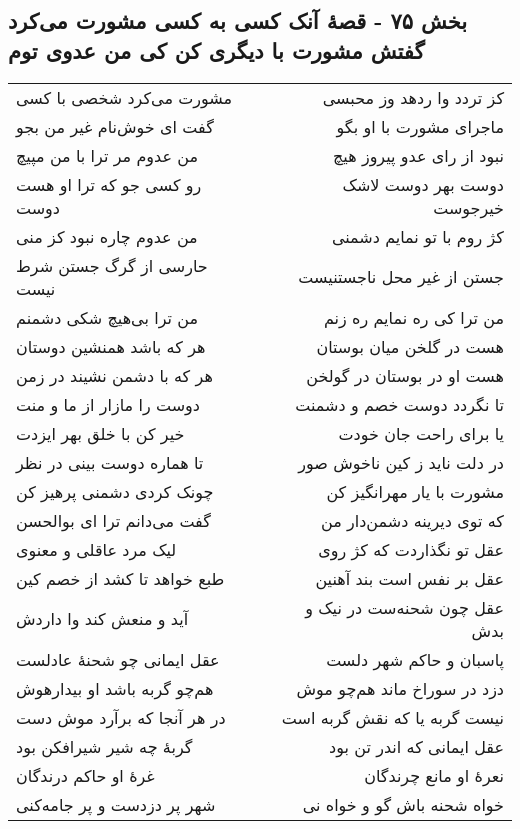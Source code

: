 \begin{center}
\section*{بخش ۷۵ - قصهٔ آنک کسی به کسی مشورت می‌کرد گفتش  مشورت با دیگری کن کی من عدوی توم}
\label{sec:sh075}
\begin{longtable}{l p{0.5cm} r}
مشورت می‌کرد شخصی با کسی
&&
کز تردد وا ردهد وز محبسی
\\
گفت ای خوش‌نام غیر من بجو
&&
ماجرای مشورت با او بگو
\\
من عدوم مر ترا با من مپیچ
&&
نبود از رای عدو پیروز هیچ
\\
رو کسی جو که ترا او هست دوست
&&
دوست بهر دوست لاشک خیرجوست
\\
من عدوم چاره نبود کز منی
&&
کژ روم با تو نمایم دشمنی
\\
حارسی از گرگ جستن شرط نیست
&&
جستن از غیر محل ناجستنیست
\\
من ترا بی‌هیچ شکی دشمنم
&&
من ترا کی ره نمایم ره زنم
\\
هر که باشد همنشین دوستان
&&
هست در گلخن میان بوستان
\\
هر که با دشمن نشیند در زمن
&&
هست او در بوستان در گولخن
\\
دوست را مازار از ما و منت
&&
تا نگردد دوست خصم و دشمنت
\\
خیر کن با خلق بهر ایزدت
&&
یا برای راحت جان خودت
\\
تا هماره دوست بینی در نظر
&&
در دلت ناید ز کین ناخوش صور
\\
چونک کردی دشمنی پرهیز کن
&&
مشورت با یار مهرانگیز کن
\\
گفت می‌دانم ترا ای بوالحسن
&&
که توی دیرینه دشمن‌دار من
\\
لیک مرد عاقلی و معنوی
&&
عقل تو نگذاردت که کژ روی
\\
طبع خواهد تا کشد از خصم کین
&&
عقل بر نفس است بند آهنین
\\
آید و منعش کند وا داردش
&&
عقل چون شحنه‌ست در نیک و بدش
\\
عقل ایمانی چو شحنهٔ عادلست
&&
پاسبان و حاکم شهر دلست
\\
هم‌چو گربه باشد او بیدارهوش
&&
دزد در سوراخ ماند هم‌چو موش
\\
در هر آنجا که برآرد موش دست
&&
نیست گربه یا که نقش گربه است
\\
گربهٔ چه شیر شیرافکن بود
&&
عقل ایمانی که اندر تن بود
\\
غرهٔ او حاکم درندگان
&&
نعرهٔ او مانع چرندگان
\\
شهر پر دزدست و پر جامه‌کنی
&&
خواه شحنه باش گو و خواه نی
\\
\end{longtable}
\end{center}
